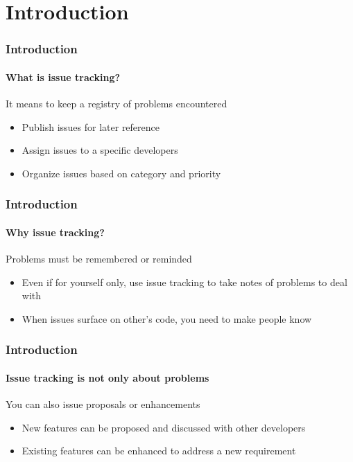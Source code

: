 \section{Introduction}

\begin{frame}
\frametitle{Introduction}
\framesubtitle{What is issue tracking?}

\begin{block}{It means to keep a registry of problems encountered}
\begin{itemize}
\item Publish issues for later reference
\item Assign issues to a specific developers
\item Organize issues based on category and priority
\end{itemize}
\end{block}

\end{frame}

\begin{frame}
\frametitle{Introduction}
\framesubtitle{Why issue tracking?}

\begin{block}{Problems must be remembered or reminded}
\begin{itemize}
\item Even if for yourself only, use issue tracking to take notes of problems to deal with
\item When issues surface on other's code, you need to make people know
\end{itemize}
\end{block}

\end{frame}

\begin{frame}
\frametitle{Introduction}
\framesubtitle{Issue tracking is not only about problems}

\begin{block}{You can also issue proposals or enhancements}
\begin{itemize}
\item New features can be proposed and discussed with other developers
\item Existing features can be enhanced to address a new requirement
\end{itemize}
\end{block}

\end{frame}

